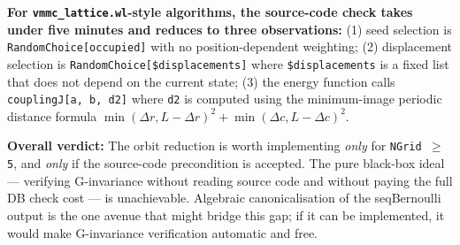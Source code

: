 \documentclass[11pt,a4paper]{article}
\begin{document}
\textbf{For \texttt{vmmc\_lattice.wl}-style algorithms, the source-code
check takes under five minutes and reduces to three observations:}
(1) seed selection is \texttt{RandomChoice[occupied]} with no
position-dependent weighting; (2) displacement selection is
\texttt{RandomChoice[\$displacements]} where \texttt{\$displacements} is a
fixed list that does not depend on the current state; (3) the energy
function calls \texttt{couplingJ[a, b, d2]} where \texttt{d2} is computed
using the minimum-image periodic distance formula
$\min(\Delta r,L{-}\Delta r)^2 + \min(\Delta c,L{-}\Delta c)^2$.

\textbf{Overall verdict:}  The orbit reduction is worth implementing
\emph{only} for \texttt{NGrid\,$\geq$\,5}, and \emph{only} if the
source-code precondition is accepted.  The pure black-box ideal ---
verifying G-invariance without reading source code and without paying the
full DB check cost --- is unachievable.  Algebraic canonicalisation of the
seqBernoulli output is the one avenue that might bridge this gap; if it
can be implemented, it would make G-invariance verification automatic and
free.
\end{document}
